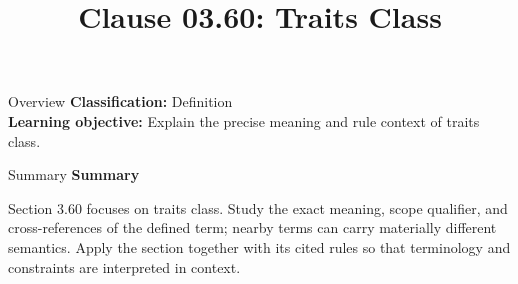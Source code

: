 \documentclass[10pt,letterpaper]{article}
\title{Clause 03.60: Traits Class}
\author{}
\date{}
\begin{document}
\maketitle
\begin{CornellOverviewBox}{Overview}
\textbf{Classification:} Definition\\[2pt]
\textbf{Learning objective:} Explain the precise meaning and rule context of traits class.
\end{CornellOverviewBox}\begin{CornellSummaryBox}{Summary}
{\sffamily\bfseries\color{Accent} Summary}\par\vspace{3pt}Section 3.60 focuses on traits class. Study the exact meaning, scope qualifier, and cross-references of the defined term; nearby terms can carry materially different semantics. Apply the section together with its cited rules so that terminology and constraints are interpreted in context.
\end{CornellSummaryBox}
\end{document}
